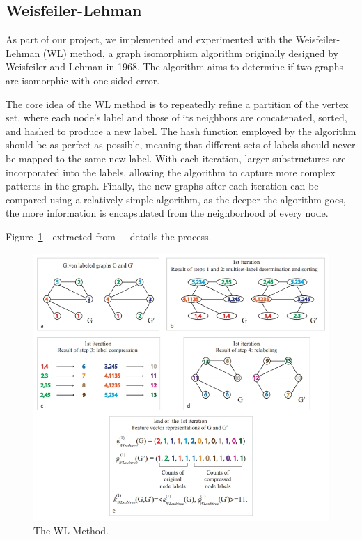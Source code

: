 \documentclass{IEEEtran}
\begin{document}
\subsection{Weisfeiler-Lehman}
As part of our project, we implemented and experimented with the Weisfeiler-Lehman (WL) method, a graph isomorphism algorithm originally designed by Weisfeiler and Lehman in 1968. The algorithm aims to determine if two graphs are isomorphic with one-sided error.

The core idea of the WL method is to repeatedly refine a partition of the vertex set, where each node's label and those of its neighbors are concatenated, sorted, and hashed to produce a new label. The hash function employed by the algorithm should be as perfect as possible, meaning that different sets of labels should never be mapped to the same new label. With each iteration, larger substructures are incorporated into the labels, allowing the algorithm to capture more complex patterns in the graph. Finally, the new graphs after each iteration can be compared using a relatively simple algorithm, as the deeper the algorithm goes, the more information is encapsulated from the neighborhood of every node.

Figure~\ref{fig:wlmethod} - extracted from~\cite{shervashidze11a} - details the process.

\begin{figure}[h]
    \centering
    \includegraphics[width=\linewidth]{wl_process.jpg}
    \caption{The WL Method.}
    \label{fig:wlmethod}
\end{figure}
\end{document}
